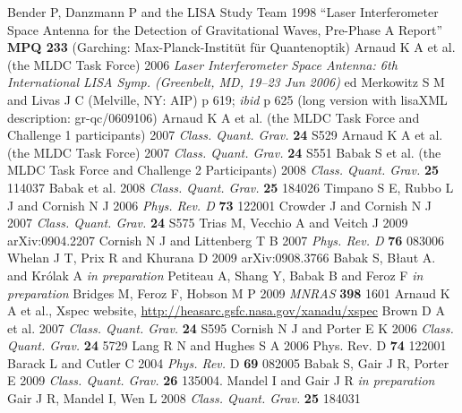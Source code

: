\documentclass{iopart}
\begin{document}
\begin{thebibliography}{99}
%
 Bender P, Danzmann P and the LISA Study Team 1998 ``Laser Interferometer Space Antenna for the Detection of Gravitational Waves, Pre-Phase A Report'' \textbf{MPQ 233} (Garching: Max-Planck-Instit\"ut f\"ur Quantenoptik) 
%
 Arnaud K A et al. (the MLDC Task Force) 2006 \textit{Laser Interferometer Space Antenna: 6th International LISA Symp. (Greenbelt, MD, 19--23 Jun 2006)} ed Merkowitz S M and Livas J C (Melville, NY: AIP) p 619; \textit{ibid} p 625 (long version with lisaXML description: gr-qc/0609106)
%
 Arnaud K A et al. (the MLDC Task Force and Challenge 1 participants) 2007 \textit{Class. Quant. Grav.} \textbf{24} S529
%
 Arnaud K A et al. (the MLDC Task Force) 2007 \textit{Class. Quant. Grav.} \textbf{24} S551
%
 Babak S et al. (the MLDC Task Force and Challenge 2 Participants) 2008 \textit{Class. Quant. Grav.} \textbf{25} 114037
%
 Babak et al. 2008 \textit{Class. Quant. Grav.} \textbf{25} 184026
%
 Timpano S E, Rubbo L J and Cornish N J 2006 \textit{Phys. Rev. D} \textbf{73} 122001
%
 Crowder J and Cornish N J 2007 \textit{Class. Quant. Grav.}  \textbf{24} S575
%
 Trias M, Vecchio A and Veitch J 2009 arXiv:0904.2207 
%
 Cornish N J and Littenberg T B 2007 \textit{Phys. Rev. D} \textbf{76} 083006
%
 Whelan J T, Prix R and Khurana D 2009 arXiv:0908.3766 
%
 Babak S, B{\l}aut A. and Kr{\'o}lak A \textit{in preparation}
%
 Petiteau A, Shang Y, Babak B and Feroz F \textit{in preparation}
%
 Bridges M, Feroz F, Hobson M P 2009 \textit{MNRAS} \textbf{398} 1601
%
 Arnaud K A et al., Xspec website, \url{http://heasarc.gsfc.nasa.gov/xanadu/xspec}
%
 Brown D A et al. 2007 \textit{Class. Quant. Grav.} \textbf{24} S595  
%
 Cornish N J and Porter E K 2006 \textit{Class. Quant. Grav.} \textbf{24} 5729
%
 Lang R N and Hughes S A 2006 Phys. Rev. D \textbf{74} 122001
%
 Barack L and Cutler C 2004 \textit{Phys. Rev.} D \textbf{69} 082005
%
 Babak S, Gair J R, Porter E 2009 \textit{Class. Quant. Grav.} \textbf{26} 135004.
%
 Mandel I and Gair J R \textit{in preparation}
%
 Gair J R, Mandel I, Wen L 2008 \textit{Class. Quant. Grav.} \textbf{25} 184031

\end{thebibliography}
\end{document}
